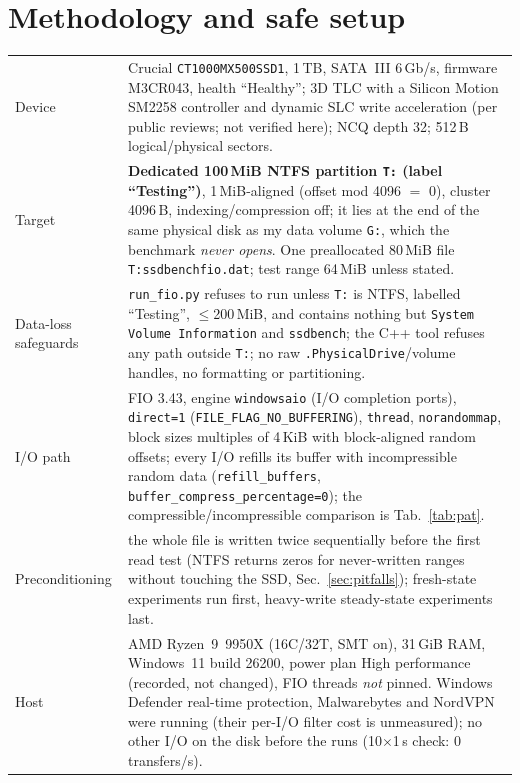﻿\documentclass[10.5pt]{article}
\begin{document}
\section{Methodology and safe setup}
\begin{center}\small
\begin{tabular}{p{3.1cm}p{12.7cm}}
\toprule
Device & Crucial \texttt{CT1000MX500SSD1}, 1\,TB, SATA~III 6\,Gb/s, firmware M3CR043, health ``Healthy''; 3D TLC with a Silicon Motion SM2258 controller and dynamic SLC write acceleration (per public reviews; not verified here); NCQ depth 32; 512\,B logical/physical sectors. \\
Target & \textbf{Dedicated 100\,MiB NTFS partition \texttt{T:} (label ``Testing'')}, 1\,MiB-aligned (offset mod 4096 $=$ 0), cluster 4096\,B, indexing/compression off; it lies at the end of the same physical disk as my data volume \texttt{G:}, which the benchmark \emph{never opens}. One preallocated 80\,MiB file \texttt{T:{\char92}ssdbench{\char92}fio.dat}; test range 64\,MiB unless stated. \\
Data-loss safeguards & \texttt{run\_fio.py} refuses to run unless \texttt{T:} is NTFS, labelled ``Testing'', $\le$200\,MiB, and contains nothing but \texttt{System Volume Information} and \texttt{ssdbench}; the C++ tool refuses any path outside \texttt{T:{\char92}}; no raw \texttt{{\char92}{\char92}.{\char92}PhysicalDrive}/volume handles, no formatting or partitioning. \\
I/O path & FIO 3.43, engine \texttt{windowsaio} (I/O completion ports), \texttt{direct=1} (\texttt{FILE\_FLAG\_NO\_BUFFERING}), \texttt{thread}, \texttt{norandommap}, block sizes multiples of 4\,KiB with block-aligned random offsets; every I/O refills its buffer with incompressible random data (\texttt{refill\_buffers}, \texttt{buffer\_compress\_percentage=0}); the compressible/incompressible comparison is Tab.~\ref{tab:pat}. \\
Preconditioning & the whole file is written twice sequentially before the first read test (NTFS returns zeros for never-written ranges without touching the SSD, Sec.~\ref{sec:pitfalls}); fresh-state experiments run first, heavy-write steady-state experiments last. \\
Host & AMD Ryzen~9~9950X (16C/32T, SMT on), 31\,GiB RAM, Windows~11 build 26200, power plan High performance (recorded, not changed), FIO threads \emph{not} pinned. Windows Defender real-time protection, Malwarebytes and NordVPN were running (their per-I/O filter cost is unmeasured); no other I/O on the disk before the runs (10$\times$1\,s check: 0 transfers/s). \\

\end{tabular}
\end{center}
\end{document}
